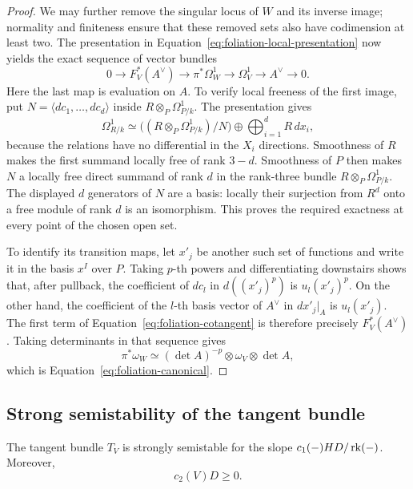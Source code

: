 \begin{proof}
We may further remove the singular locus of $W$ and its inverse image;
normality and finiteness ensure that these removed sets also have
codimension at least two.  The presentation in
Equation~\eqref{eq:foliation-local-presentation} now yields the exact
sequence of vector bundles
\begin{equation}
  0\longrightarrow F_V^*(A^\vee)
  \longrightarrow\pi^*\Omega_W^1
  \longrightarrow\Omega_V^1
  \longrightarrow A^\vee\longrightarrow0.
  \label{eq:foliation-cotangent}
\end{equation}
Here the last map is evaluation on $A$.  To verify local freeness of the
first image, put $N=\langle dc_1,\ldots,dc_d\rangle$ inside
$R\otimes_P\Omega_{P/k}^1$.  The presentation gives
\[
  \Omega_{R/k}^1\simeq
  \bigl((R\otimes_P\Omega_{P/k}^1)/N\bigr)
  \oplus\bigoplus_{i=1}^dR\,dx_i,
\]
because the relations have no differential in the $X_i$ directions.
Smoothness of $R$ makes the first summand locally free of rank $3-d$.
Smoothness of $P$ then makes $N$ a locally free direct summand of rank
$d$ in the rank-three bundle $R\otimes_P\Omega_{P/k}^1$.  The displayed
$d$ generators of $N$ are a basis: locally their surjection from $R^d$
onto a free module of rank $d$ is an isomorphism.  This proves the
required exactness at every point of the chosen open set.

To identify its transition maps, let $x'_j$ be another such set of
functions and write it in the basis $x^I$ over $P$.  Taking $p$-th powers
and differentiating downstairs shows that, after pullback, the
coefficient of $dc_l$ in $d((x'_j)^p)$ is $u_l(x'_j)^p$.  On the other
hand, the coefficient of the $l$-th basis vector of $A^\vee$ in
$dx'_j|_A$ is $u_l(x'_j)$.  The first term of
Equation~\eqref{eq:foliation-cotangent} is therefore precisely
$F_V^*(A^\vee)$.  Taking determinants in that sequence gives
\[
  \pi^*\omega_W
  \simeq(\det A)^{-p}\otimes\omega_V\otimes\det A,
\]
which is Equation~\eqref{eq:foliation-canonical}.
\end{proof}

\subsection{Strong semistability of the tangent bundle}

\begin{proposition}
\label{prop:strong-semistability}
The tangent bundle $T_V$ is strongly semistable for the slope
$c_1(-)HD/\operatorname{rk}(-)$.  Moreover,
\begin{equation}
  c_2(V)D\ge0.
  \label{eq:c2-nonnegative}
\end{equation}
\end{proposition}

